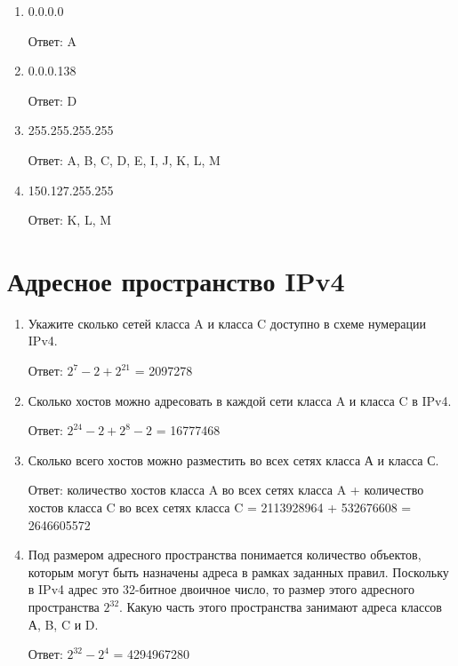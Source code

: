 \documentclass[bachelor, och, labwork]{shiza}
\begin{document}
\begin{enumerate}
    \item 0.0.0.0 
    
    Ответ: A
    \item 0.0.0.138 
    
    Ответ: D
    \item 255.255.255.255 
    
    Ответ: A, B, C, D, E, I, J, K, L, M
    \item 150.127.255.255 
    
    Ответ: K, L, M

\end{enumerate}

\section{Адресное пространство IPv4}
    \begin{enumerate}
        \item Укажите сколько сетей класса A и класса C доступно в схеме нумерации IPv4.
        
        Ответ: $2^7 - 2 + 2^{21}$ = 2097278
        \item Сколько хостов можно адресовать в каждой сети класса A и класса C в IPv4.
        
        Ответ: $2^{24} - 2 + 2^8 - 2$ = 16777468

        \item Сколько всего хостов можно разместить во всех сетях класса А и класса С.
        
        Ответ: количество хостов класса A во всех сетях класса A + количество хостов класса C во всех сетях класса C = 2113928964 + 532676608 = 2646605572

        \item Под размером адресного пространства понимается количество объектов, которым могут быть назначены адреса в рамках заданных правил. Поскольку в IPv4
        адрес это 32-битное двоичное число, то размер этого адресного пространства $2^{32}$. Какую часть этого пространства занимают адреса классов А, B, C и D.

        Ответ: $2^{32} - 2^4$ = 4294967280
        
    \end{enumerate}
\end{document}
